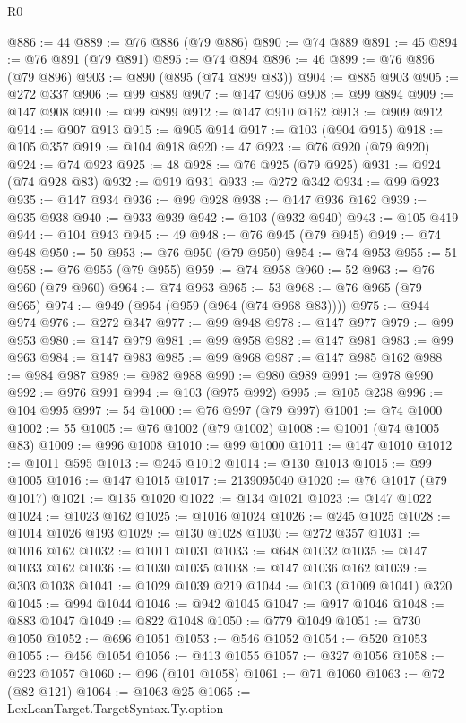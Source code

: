 \begin{lexlean}{R0}
\begin{coremodule}
@886 := 44
@889 := @76 @886 (@79 @886)
@890 := @74 @889
@891 := 45
@894 := @76 @891 (@79 @891)
@895 := @74 @894
@896 := 46
@899 := @76 @896 (@79 @896)
@903 := @890 (@895 (@74 @899 @83))
@904 := @885 @903
@905 := @272 @337
@906 := @99 @889
@907 := @147 @906
@908 := @99 @894
@909 := @147 @908
@910 := @99 @899
@912 := @147 @910 @162
@913 := @909 @912
@914 := @907 @913
@915 := @905 @914
@917 := @103 (@904 @915)
@918 := @105 @357
@919 := @104 @918
@920 := 47
@923 := @76 @920 (@79 @920)
@924 := @74 @923
@925 := 48
@928 := @76 @925 (@79 @925)
@931 := @924 (@74 @928 @83)
@932 := @919 @931
@933 := @272 @342
@934 := @99 @923
@935 := @147 @934
@936 := @99 @928
@938 := @147 @936 @162
@939 := @935 @938
@940 := @933 @939
@942 := @103 (@932 @940)
@943 := @105 @419
@944 := @104 @943
@945 := 49
@948 := @76 @945 (@79 @945)
@949 := @74 @948
@950 := 50
@953 := @76 @950 (@79 @950)
@954 := @74 @953
@955 := 51
@958 := @76 @955 (@79 @955)
@959 := @74 @958
@960 := 52
@963 := @76 @960 (@79 @960)
@964 := @74 @963
@965 := 53
@968 := @76 @965 (@79 @965)
@974 := @949 (@954 (@959 (@964 (@74 @968 @83))))
@975 := @944 @974
@976 := @272 @347
@977 := @99 @948
@978 := @147 @977
@979 := @99 @953
@980 := @147 @979
@981 := @99 @958
@982 := @147 @981
@983 := @99 @963
@984 := @147 @983
@985 := @99 @968
@987 := @147 @985 @162
@988 := @984 @987
@989 := @982 @988
@990 := @980 @989
@991 := @978 @990
@992 := @976 @991
@994 := @103 (@975 @992)
@995 := @105 @238
@996 := @104 @995
@997 := 54
@1000 := @76 @997 (@79 @997)
@1001 := @74 @1000
@1002 := 55
@1005 := @76 @1002 (@79 @1002)
@1008 := @1001 (@74 @1005 @83)
@1009 := @996 @1008
@1010 := @99 @1000
@1011 := @147 @1010
@1012 := @1011 @595
@1013 := @245 @1012
@1014 := @130 @1013
@1015 := @99 @1005
@1016 := @147 @1015
@1017 := 2139095040
@1020 := @76 @1017 (@79 @1017)
@1021 := @135 @1020
@1022 := @134 @1021
@1023 := @147 @1022
@1024 := @1023 @162
@1025 := @1016 @1024
@1026 := @245 @1025
@1028 := @1014 @1026 @193
@1029 := @130 @1028
@1030 := @272 @357
@1031 := @1016 @162
@1032 := @1011 @1031
@1033 := @648 @1032
@1035 := @147 @1033 @162
@1036 := @1030 @1035
@1038 := @147 @1036 @162
@1039 := @303 @1038
@1041 := @1029 @1039 @219
@1044 := @103 (@1009 @1041) @320
@1045 := @994 @1044
@1046 := @942 @1045
@1047 := @917 @1046
@1048 := @883 @1047
@1049 := @822 @1048
@1050 := @779 @1049
@1051 := @730 @1050
@1052 := @696 @1051
@1053 := @546 @1052
@1054 := @520 @1053
@1055 := @456 @1054
@1056 := @413 @1055
@1057 := @327 @1056
@1058 := @223 @1057
@1060 := @96 (@101 @1058)
@1061 := @71 @1060
@1063 := @72 (@82 @121)
@1064 := @1063 @25
@1065 := LexLeanTarget.TargetSyntax.Ty.option

\end{coremodule}
\end{lexlean}
